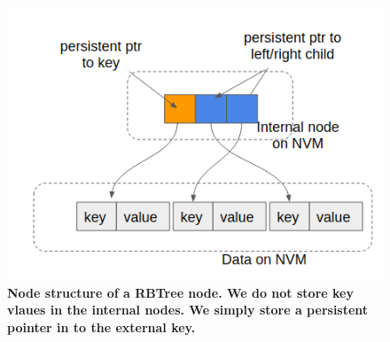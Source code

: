 \begin{figure}[]   
	\centering
	\includegraphics[width=\linewidth]{figures/zerocopy.png} 
	\caption{\bf Node structure of a RBTree node. We do not store key vlaues in the internal nodes. We simply
	store a persistent pointer in to the external key.} 
	\label{fig:zerocopy} 
\end{figure}


\cite{pmwcas}
